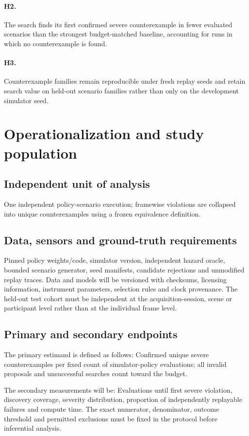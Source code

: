 \documentclass[11pt,a4paper]{article}
\begin{document}
\paragraph{H2.} The search finds its first confirmed severe counterexample in fewer evaluated scenarios than the strongest budget-matched baseline, accounting for runs in which no counterexample is found.

\paragraph{H3.} Counterexample families remain reproducible under fresh replay seeds and retain search value on held-out scenario families rather than only on the development simulator seed.

\section{Operationalization and study population}
\subsection{Independent unit of analysis}
One independent policy-scenario execution; framewise violations are collapsed into unique counterexamples using a frozen equivalence definition.

\subsection{Data, sensors and ground-truth requirements}
Pinned policy weights/code, simulator version, independent hazard oracle, bounded scenario generator, seed manifests, candidate rejections and unmodified replay traces. Data and models will be versioned with checksums, licensing information, instrument parameters, selection rules and clock provenance. The held-out test cohort must be independent at the acquisition-session, scene or participant level rather than at the individual frame level.

\subsection{Primary and secondary endpoints}
The primary estimand is defined as follows: Confirmed unique severe counterexamples per fixed count of simulator-policy evaluations; all invalid proposals and unsuccessful searches count toward the budget.

The secondary measurements will be: Evaluations until first severe violation, discovery coverage, severity distribution, proportion of independently replayable failures and compute time. The exact numerator, denominator, outcome threshold and permitted exclusions must be fixed in the protocol before inferential analysis.
\end{document}
